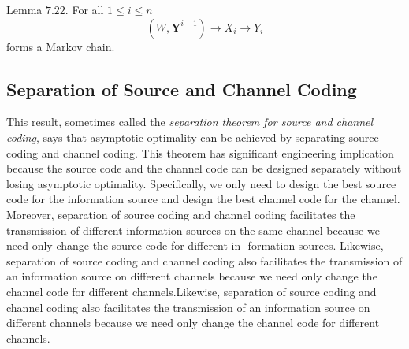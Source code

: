 \documentclass[8pt]{article}
\begin{document}
\begin{tcolorbox}
Lemma $7.22 .$ For all $1 \leq i \leq n$
$$
\left(W, \mathbf{Y}^{i-1}\right) \rightarrow X_{i} \rightarrow Y_{i}
$$
forms a Markov chain.
\end{tcolorbox}
\subsection{Separation of Source and Channel Coding}
This result, sometimes called the \emph{separation theorem for source and channel coding}, says that asymptotic optimality can be achieved by separating source coding and channel coding. This theorem has significant engineering implication because the source code and the channel code can be designed separately without losing asymptotic optimality. Specifically, we only need to design the best source code for the information source and design the best channel code for the channel. Moreover, separation of source coding and channel coding facilitates the transmission of different information sources on the same channel because we need only change the source code for different in- formation sources. Likewise, separation of source coding and channel coding also facilitates the transmission of an information source on different channels because we need only change the channel code for different channels.Likewise, separation of source coding and channel coding also facilitates the transmission of an information source on different channels because we need only change the channel code for different channels.
\end{document}
